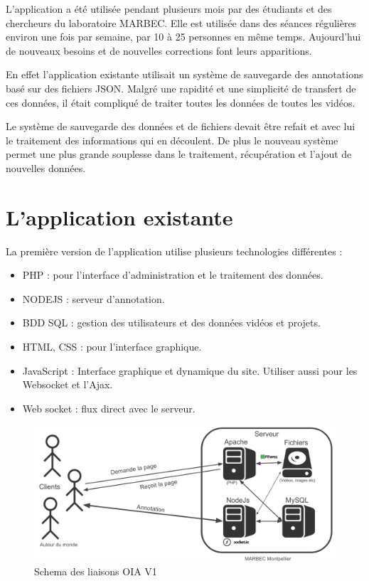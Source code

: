 \documentclass[12pt]{article}
\begin{document}
L’application a été utilisée pendant plusieurs mois par des étudiants et des chercheurs du laboratoire MARBEC. Elle est utilisée dans des séances régulières environ une fois par semaine, par 10 à 25 personnes en même temps. Aujourd’hui de nouveaux besoins et de nouvelles corrections font leurs apparitions.
\par
En effet l’application existante utilisait un système de sauvegarde des annotations basé sur des fichiers JSON. Malgré une rapidité et une simplicité de transfert de ces données, il était compliqué de traiter toutes les données de toutes les vidéos.
\par
Le système de sauvegarde des données et de fichiers devait être refait et avec lui le traitement des informations qui en découlent. De plus le nouveau système permet une plus grande souplesse dans le traitement, récupération et l’ajout de nouvelles données. 


\section{L'application existante}
La première version de l’application utilise plusieurs technologies différentes :
\begin{itemize}
    \item PHP : pour l’interface d’administration et le traitement des données.
    \item NODEJS : serveur d’annotation.
    \item BDD SQL : gestion des utilisateurs et des données vidéos et projets.
    \item HTML, CSS : pour l’interface graphique.
    \item JavaScript : Interface graphique et dynamique du site. Utiliser aussi pour les Websocket et l'Ajax.
    \item Web socket : flux direct avec le serveur.
\end{itemize}

\par
[Figure 1]

\begin{figure}[H]
\centering
\includegraphics[width=1\textwidth]{img/oia_v1_schema.png}
 \caption{Schema des liaisons OIA V1}
\end{figure}
\end{document}
